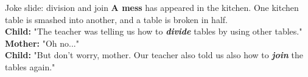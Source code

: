 \documentclass[10pt,aspectratio=169]{beamer}
\begin{document}
\begin{frame}{Joke slide: division and join}
\vspace{0.6em}
\small
\small
\textbf{A mess} has appeared in the kitchen. One kitchen table is smashed
into another, and a table is broken in half.\\[0.6em]

\textbf{Child:} "The teacher was telling us how to \textbf{\textit{divide}} tables by using other tables."\\[0.4em]
\textbf{Mother:} "Oh no..."\\[0.4em]
\textbf{Child:} "But don't worry, mother. Our teacher also told us also how to \textbf{\textit{join}} the tables again."\\
\end{frame}
\end{document}

